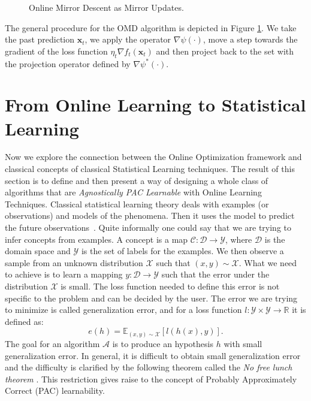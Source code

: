 \begin{figure}[!ht]
\centering

\caption{Online Mirror Descent as Mirror Updates.}
\label{fig:OMD_mirror}
\end{figure}

The general procedure for the OMD algorithm is depicted in Figure \ref{fig:OMD_mirror}. We take the past prediction $\mathbf x_t$, we apply the operator $\nabla \psi(\cdot)$, move a step towards the gradient of the loss function $\eta_t\nabla f_t(\mathbf x_t)$ and then project back to the set with the projection operator defined by $\nabla \psi^*(\cdot)$.

\section{From Online Learning to Statistical Learning}\label{sec:stat_learning}
Now we explore the connection between the Online Optimization framework and classical concepts of classical Statistical Learning techniques. The result of this section is to define and then present a way of designing a whole class of algorithms that are \emph{Agnostically PAC Learnable} with Online Learning Techniques. 
Classical statistical learning theory deals with examples (or observations) and models of the phenomena. Then it uses the model to predict the future observations~\cite{bousquet2003introduction}. Quite informally one could say that we are trying to infer concepts from examples. A concept is a map $\mathcal C:\mathcal D\to\mathcal Y$, where $\mathcal D$ is the domain space and $\mathcal Y$ is the set of labels for the examples. We then observe a sample from an unknown distribution $\mathcal X$ such that $(x,y)\sim \mathcal X$. What we need to achieve is to learn a mapping $y:\mathcal D\to\mathcal Y$ such that the error under the distribution $\mathcal X$ is small. The loss function needed to define this error is not specific to the problem and can be decided by the user. The error we are trying to minimize is called generalization error, and for a loss function $l:\mathcal Y\times\mathcal Y \to\mathbb R$ it is defined as:
\begin{equation}\label{eq:generalization}
    e(h) = \mathbb E_{(x,y)\sim \mathcal X}[l(h(x),y)].
\end{equation}
The goal for an algorithm $\mathcal A$ is to produce an hypothesis $h$ with small generalization error. 
In general, it is difficult to obtain small generalization error and the difficulty is clarified by the following theorem called the \emph{No free lunch theorem} \cite{mitchell1997machine}.
This restriction gives raise to the concept of Probably Approximately Correct (PAC) learnability. 

